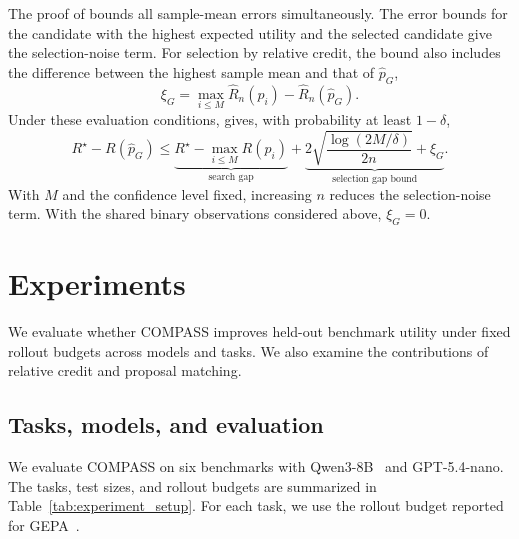 The proof of  bounds all sample-mean errors
simultaneously.  The error bounds for the candidate with the highest expected utility
and the selected candidate give the selection-noise term.  For selection by
relative credit, the bound also includes the difference between the highest
sample mean and that of $\widehat p_G$,
\begin{equation}
\xi_G=\max_{i\le M}\widehat R_n(p_i)-\widehat R_n(\widehat p_G).
\label{eq:g_selection_gap}
\end{equation}
Under these evaluation conditions,  gives, with
probability at least $1-\delta$,
\begin{equation}
R^\star-R(\widehat p_G)
\le \underbrace{R^\star-\max_{i\le M}R(p_i)}_{\text{search gap}}
+\underbrace{2\sqrt{\frac{\log(2M/\delta)}{2n}}+\xi_G}_{\text{selection gap bound}}.
\label{eq:g_selection_regret}
\end{equation}
With $M$ and the confidence level fixed, increasing $n$ reduces the
selection-noise term.  With the shared binary observations considered above,
$\xi_G=0$.

\section{Experiments}
\label{sec:experiments}

We evaluate whether COMPASS improves held-out benchmark utility under fixed
rollout budgets across models and tasks.  We also examine the contributions of
relative credit and proposal matching.

\subsection{Tasks, models, and evaluation}

We evaluate COMPASS on six benchmarks with
Qwen3-8B~\citep{qwen3_technical_report} and GPT-5.4-nano.  The tasks,
test sizes, and rollout budgets are summarized in
Table~\ref{tab:experiment_setup}.  For each task, we use the rollout budget
reported for GEPA~\citep{gepa}.

